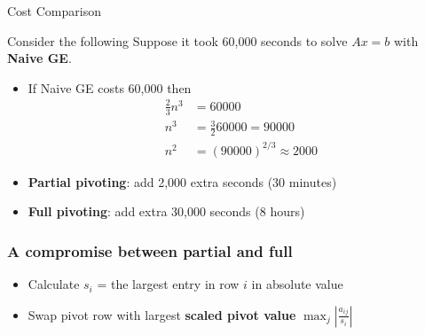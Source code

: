 \documentclass[10pt]{beamer}
\begin{document}
\begin{frame}{Cost Comparison}

\begin{block}{Consider the following }
    Suppose it took 60,000 seconds to solve $Ax=b$ with \textbf{Naive GE}. 
\end{block}

\begin{itemize}
    \item If Naive GE costs 60,000 then
        \begin{align*}
            \frac{2}{3}n^3 &= 60000\\
            n^3 &= \frac{3}{2}60000 = 90000\\
            n^2 &= (90000)^{2/3} \approx 2000 
        \end{align*}

    \item \textbf{Partial pivoting}: add 2,000 extra seconds (30 minutes)

    \item \textbf{Full pivoting}: add extra 30,000 seconds (8 hours)
\end{itemize}

    
\end{frame}



\begin{frame}
\frametitle{A compromise between partial and full}


\begin{center}
\end{center}
\begin{itemize}
   \item Calculate $s_i$ = the largest entry in row $i$ in absolute value

   \item Swap pivot row with largest \textbf{scaled pivot value} $\max_j \left| \frac{a_{ij}}{s_i}\right|$

\end{itemize}
\end{frame}
\end{document}
